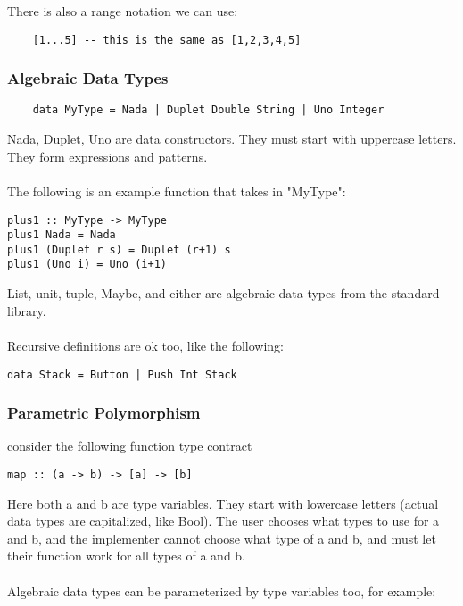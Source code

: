 \documentclass[12pt]{article}
\begin{document}
There is also a range notation we can use:

\begin{lstlisting}
	[1...5] -- this is the same as [1,2,3,4,5]
\end{lstlisting}

\subsubsection{Algebraic Data Types}

\begin{lstlisting}
	data MyType = Nada | Duplet Double String | Uno Integer
\end{lstlisting}

Nada, Duplet, Uno are data constructors. They must start with uppercase letters. They form expressions and patterns.\\
\\
The following is an example function that takes in "MyType":

\begin{lstlisting}
plus1 :: MyType -> MyType
plus1 Nada = Nada
plus1 (Duplet r s) = Duplet (r+1) s
plus1 (Uno i) = Uno (i+1)
\end{lstlisting}

List, unit, tuple, Maybe, and either are algebraic data types from the standard library.\\
\\
Recursive definitions are ok too, like the following:

\begin{lstlisting}
data Stack = Button | Push Int Stack
\end{lstlisting}

\subsubsection{Parametric Polymorphism}

consider the following function type contract

\begin{lstlisting}
map :: (a -> b) -> [a] -> [b]
\end{lstlisting}

Here both a and b are type variables. They start with lowercase letters (actual data types are capitalized, like Bool). The user chooses what types to use for a and b, and the implementer cannot choose what type of a and b, and must let their function work for all types of a and b.\\
\\
Algebraic data types can be parameterized by type variables too, for example:
\end{document}
